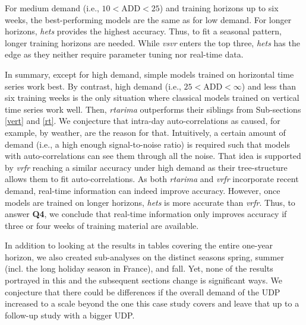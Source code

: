 For medium demand (i.e., $10 < \text{ADD} < 25$) and training horizons up to
    six weeks, the best-performing models are the same as for low demand.
For longer horizons, \textit{hets} provides the highest accuracy.
Thus, to fit a seasonal pattern, longer training horizons are needed.
While \textit{vsvr} enters the top three, \textit{hets} has the edge as they
    neither require parameter tuning nor real-time data.

In summary, except for high demand, simple models trained on horizontal time
    series work best.
By contrast, high demand (i.e., $25 < \text{ADD} < \infty$) and less than
    six training weeks is the only situation where classical models trained on
    vertical time series work well.
Then, \textit{rtarima} outperforms their siblings from Sub-sections
    \ref{vert} and \ref{rt}.
We conjecture that intra-day auto-correlations as caused, for example, by
    weather, are the reason for that.
Intuitively, a certain amount of demand (i.e., a high enough signal-to-noise
    ratio) is required such that models with auto-correlations can see them
    through all the noise.
That idea is supported by \textit{vrfr} reaching a similar accuracy under
    high demand as their tree-structure allows them to fit auto-correlations.
As both \textit{rtarima} and \textit{vrfr} incorporate recent demand,
    real-time information can indeed improve accuracy.
However, once models are trained on longer horizons, \textit{hets} is more
    accurate than \textit{vrfr}.
Thus, to answer \textbf{Q4}, we conclude that real-time information only
    improves accuracy if three or four weeks of training material are
    available.

In addition to looking at the results in tables covering the entire one-year
    horizon, we also created sub-analyses on the distinct seasons spring,
    summer (incl. the long holiday season in France), and fall.
Yet, none of the results portrayed in this and the subsequent sections change
    is significant ways.
We conjecture that there could be differences if the overall demand of the UDP
    increased to a scale beyond the one this case study covers and leave that
    up to a follow-up study with a bigger UDP.
